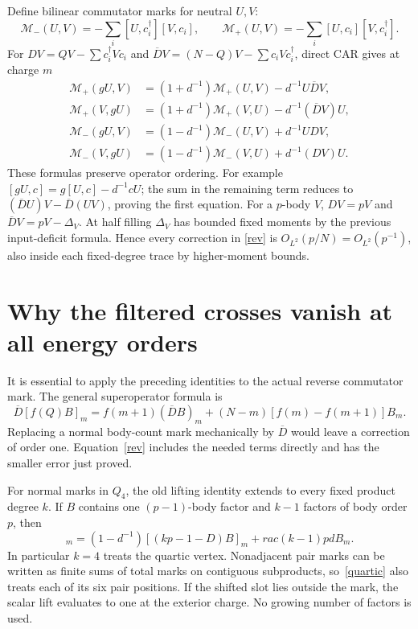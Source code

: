 \documentclass[11pt,a4paper]{article}
\newcommand{\Db}{\overline D}
\begin{document}
Define bilinear commutator marks for neutral $U,V$:
\begin{equation}
 \mathcal M_-(U,V)=-\sum_i[U,c_i^\dagger][V,c_i],\qquad
 \mathcal M_+(U,V)=-\sum_i[U,c_i][V,c_i^\dagger].
\end{equation}
For $D V=QV-\sum c_i^\dagger Vc_i$ and
$\Db V=(N-Q)V-\sum c_iVc_i^\dagger$, direct CAR gives at charge $m$
\begin{align}
 \mathcal M_+(gU,V)&=(1+d^{-1})\mathcal M_+(U,V)-d^{-1}U\Db V,\\
 \mathcal M_+(V,gU)&=(1+d^{-1})\mathcal M_+(V,U)-d^{-1}(\Db V)U,\label{rev}\\
 \mathcal M_-(gU,V)&=(1-d^{-1})\mathcal M_-(U,V)+d^{-1}UDV,\\
 \mathcal M_-(V,gU)&=(1-d^{-1})\mathcal M_-(V,U)+d^{-1}(DV)U.
\end{align}
These formulas preserve operator ordering. For example
$[gU,c]=g[U,c]-d^{-1}cU$; the sum in the remaining term reduces
to $(\Db U)V-\Db(UV)$, proving the first equation.
For a $p$-body $V$, $DV=pV$ and $\Db V=pV-\Delta_V$.
At half filling $\Delta_V$ has bounded fixed moments by the
previous input-deficit formula. Hence every correction in
\eqref{rev} is $O_{L^2}(p/N)=O_{L^2}(p^{-1})$, also inside each
fixed-degree trace by higher-moment bounds.

\newpage
\section{Why the filtered crosses vanish at all energy orders}
It is essential to apply the preceding identities to the actual
reverse commutator mark. The general superoperator formula is
\begin{equation}
 \Db[f(Q)B]_m=f(m+1)(\Db B)_m
              +(N-m)[f(m)-f(m+1)]B_m.
\end{equation}
Replacing a normal body-count mark mechanically by $\Db$ would
leave a correction of order one. Equation~\eqref{rev} includes
the needed terms directly and has the smaller error just proved.

For normal marks in $Q_4$, the old lifting identity extends to
every fixed product degree $k$. If $B$ contains one $(p-1)$-body
factor and $k-1$ factors of body order $p$, then
\begin{equation}
 [(kp-D)(gB)]_m
 =(1-d^{-1})[(kp-1-D)B]_m+rac{(k-1)p}{d}B_m. \label{quartic}
\end{equation}
In particular $k=4$ treats the quartic vertex. Nonadjacent pair
marks can be written as finite sums of total marks on contiguous
subproducts, so~\eqref{quartic} also treats each of its six pair
positions. If the shifted slot lies outside the mark, the scalar
lift evaluates to one at the exterior charge. No growing number
of factors is used.
\end{document}
